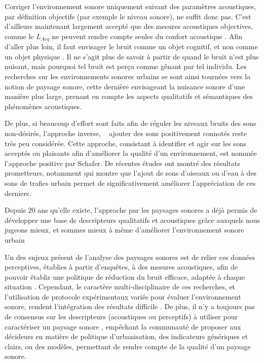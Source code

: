 Corriger l'environnement sonore uniquement suivant des paramètres acoustiques, par définition objectifs (par exemple le niveau sonore), ne suffit donc pas. C'est d'ailleurs maintenant largement accepté que des mesures acoustiques objectives, comme le $L_{Aeq}$ ne peuvent rendre compte seules du confort acoustique \citep{yang2005acoustic,schulte2006soundscape,kang2010semantic,aletta2016soundscape}. Afin d'aller plus loin, il faut envisager le bruit comme un objet cognitif, et non comme un objet physique \citep{guastavino_etude_2003}. Il ne s'agit plus de savoir à partir de quand le bruit n'est plus nuisant, mais pourquoi tel bruit est perçu comme gênant par tel individu. Les recherches sur les environnements sonores urbains se sont ainsi tournées vers la notion de paysage sonore, cette dernière envisageant la nuisance sonore d'une manière plus large, prenant en compte les aspects qualitatifs et sémantiques des phénomènes acoustiques. 

De plus, si beaucoup d’effort sont faits afin de réguler les niveaux bruits des sons non-désirés,  l'approche inverse, \ie~ ajouter des sons positivement connotés reste très peu considérée. Cette approche, consistant à identifier et agir sur les sons acceptés ou plaisants afin d'améliorer la qualité d'un environnement, est nommée l'approche positive par Schafer. De récentes études ont montré des résultats prometteurs, notamment \citep{hong2013designing} qui montre que l'ajout de sons d'oiseaux ou d'eau à des sons de trafics urbain permet de significativement améliorer l'appréciation de ces derniers. 

Depuis 20 ans qu'elle existe, l'approche par les paysages sonores a déjà permis de développer une base de descripteurs qualitatifs et acoustiques grâce auxquels nous jugeons mieux, et sommes mieux à même d'améliorer l'environnement sonore urbain  \citep{kang2006urban,schulte2007soundscape}

Un des enjeux présent de l'analyse des paysages sonores est de relier ces données perceptives, établies à partir d'enquêtes, à des mesures acoustiques, afin de pouvoir établir une politique de réduction du bruit efficace, adaptée à chaque situation \citep{schulte2013soundscape}.
Cependant, le caractère multi-disciplinaire de ces recherches, et l'utilisation de protocole expérimentaux variés pour évaluer l'environnement sonore, rendent l’intégration des résultats difficile \citep{davies2013perception}. De plus, il n'y a toujours pas de consensus sur les descripteurs (acoustiques ou perceptifs) à utiliser pour caractériser un paysage sonore \citep{brocolini2012prediction,aletta2016soundscape}, empêchant la communauté de proposer aux décideurs en matière de politique d'urbanisation, des indicateurs génériques et clairs, ou des modèles, permettant de rendre compte de la qualité d'un paysage sonore.

